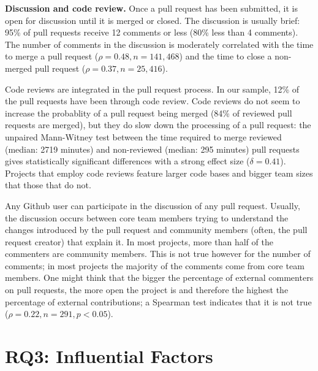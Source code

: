 \documentclass{sig-alternate}
\begin{document}
\textbf{Discussion and code review.}
Once a pull request has been submitted, it is open for discussion until it is
merged or closed. The discussion is usually brief: 95\% of pull requests receive
12 comments or less (80\% less than 4 comments). The number of
comments in the discussion is moderately correlated with the time to merge a
pull request ($\rho = 0.48, n = 141,468$) and the time to close a non-merged
pull request ($\rho = 0.37, n = 25,416$).

Code reviews are integrated in the pull request process. In our sample, 12\% of
the pull requests have been through code review. Code reviews do not seem to
increase the probablity of a pull request being merged (84\% of reviewed pull
requests are merged), but they do slow down the processing of a pull request:
the unpaired Mann-Witney test between the time required to merge reviewed
(median: 2719 minutes) and non-reviewed (median: 295 minutes) pull requests
gives statistically significant differences with a strong effect size ($\delta =
0.41$). Projects that employ code reviews feature larger code bases and 
bigger team sizes that those that do not.

Any Github user can participate in the discussion of any pull request. Usually,
the discussion occurs between core team members trying to understand the changes
introduced by the pull request and community members (often, the pull request
creator) that explain it. In most projects, more than half of the commenters are
community members. This is not true however for the number of comments; in most
projects the majority of the comments come from core team members. One might
think that the bigger the percentage of external commenters on pull requests,
the more open the project is and therefore the highest the percentage of
external contributions; a Spearman test indicates that it is not true ($\rho =
0.22, n = 291, p < 0.05$).

\section{RQ3: Influential Factors}
\label{sec:accrej}
\end{document}
